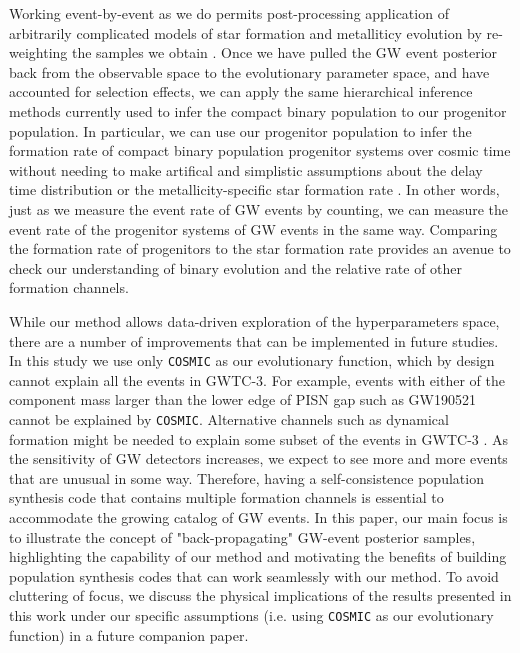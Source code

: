 \documentclass[linenumbers,twocolumn]{aastex631}
\begin{document}
Working event-by-event as we do permits post-processing application of
arbitrarily complicated models of star formation and metalliticy evolution by
re-weighting the samples we obtain \citep[e.g.][]{VanSon2022}. Once we have
pulled the GW event posterior back from the observable space to the evolutionary
parameter space, and have accounted for selection effects, we can apply
the same hierarchical inference methods currently used to infer the compact
binary population to our progenitor population.  In particular, we can use our
progenitor population to infer the formation rate of compact binary population
progenitor systems over cosmic time without needing to make artifical and
simplistic assumptions about the delay time distribution or the
metallicity-specific star formation rate \citep{Vitale2019,Ng2021,VanSon2022}.
In other words, just as we measure the event rate of GW events by
counting, we can measure the event rate of the progenitor systems of GW events
in the same way. Comparing the formation rate of progenitors to the star
formation rate provides an avenue to check our understanding of binary evolution
and the relative rate of other formation channels.

While our method allows data-driven exploration of the hyperparameters space, there are a number of improvements that can be implemented in future studies.
In this study we use only \texttt{COSMIC} as our evolutionary function, which by design cannot explain all the events in GWTC-3.
For example, events with either of the component mass larger than the lower edge of PISN gap such as GW190521 cannot be explained by \texttt{COSMIC}.
Alternative channels such as dynamical formation might be needed to explain some subset of the events in GWTC-3 \citep{Zevin2021}.
As the sensitivity of GW detectors increases, we expect to see more and more events that are unusual in some way.
Therefore, having a self-consistence population synthesis code that contains multiple formation channels is essential to accommodate the growing catalog of GW events.
In this paper, our main focus is to illustrate the concept of "back-propagating" GW-event posterior samples,
highlighting the capability of our method and motivating the benefits of building population synthesis codes that can work seamlessly with our method.
To avoid cluttering of focus, we discuss the physical implications of the results presented in this work under our specific assumptions (i.e. using \texttt{COSMIC} as our evolutionary function) in a future companion paper.
\end{document}

